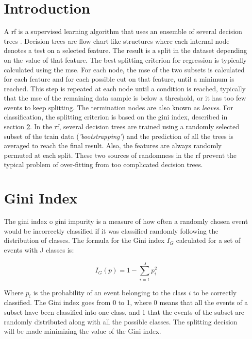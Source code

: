 \documentclass[main.tex]{subfiles}
\begin{document}
\glsresetall

\section{Introduction}

A \gls{rf} is a supervised learning algorithm that uses an ensemble of several decision trees \cite{breiman2001random}.
Decision trees are flow-chart-like structures where each internal node denotes a test on a selected feature. The result is a split in the dataset depending on the value of that feature. The best splitting criterion for regression is typically calculated using the \gls{mse}. For each node, the \gls{mse} of the two subsets is calculated for each feature and for each possible cut on that feature, until a minimum is reached. This step is repeated at each node until a condition is reached, typically that the \gls{mse} of the remaining data sample is below a threshold, or it has too few events to keep splitting. The termination nodes are also known as \textit{leaves}. For classification, the splitting criterion is based on the gini index, described in section \ref{sec:giniidx}.
In the \gls{rf}, several decision trees are trained using a randomly selected subset of the train data (\textit{'bootstrapping'}) and the prediction of all the trees is averaged to reach the final result. Also, the features are always randomly permuted at each split. These two sources of randomness in the \gls{rf} prevent the typical problem of over-fitting from too complicated decision trees.

\section{Gini Index} \label{sec:giniidx}

The gini index o gini impurity is a measure of how often a randomly chosen event would be incorrectly classified if it was classified randomly following the distribution of classes. The formula for the Gini index $I_G$ calculated for a set of events with J classes is:

\begin{equation}
  I_G(p) = 1 - \sum_{i=1}^J p_i^2
\end{equation}

Where $p_i$ is the probability of an event belonging to the class $i$ to be correctly classified.  The Gini index goes from 0 to 1, where 0 means that all the events of a subset have been classified into one class, and 1 that the events of the subset are randomly distributed along with all the possible classes. The splitting decision will be made minimizing the value of the Gini index.
\end{document}
